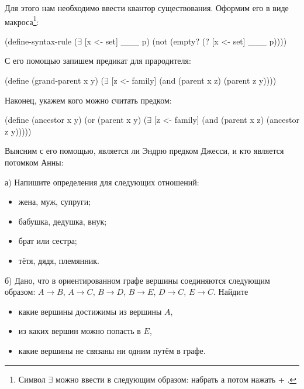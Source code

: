 Для этого нам необходимо ввести квантор существования. Оформим его в виде макроса\footnote{Символ $\exists$ можно ввести в  следующим образом: набрать \s{\\exists} а потом нажать  + \s{\\}.}:

\begin{Definition}[emph={x,set,p}]
(define-syntax-rule ($\exists$ [x <- set] ___ p)
  (not (empty? (? [x <- set] ___ p)))) 
\end{Definition}

С его помощью запишем предикат для прародителя:
\begin{Definition}[emph={x,y,z}]
(define (grand-parent x y)
  ($\exists$ [z <- family] (and (parent x z) (parent z y))))
\end{Definition}

Наконец, укажем кого можно считать предком:
\begin{Definition}[emph={x,y,z}]
(define (ancestor x y) 
  (or (parent x y)
      ($\exists$ [z <- family] (and (parent x z) (ancestor z y)))))  
\end{Definition}

Выясним с его помощью, является ли Эндрю предком Джесси, и кто является потомком Анны:

\newpage
\begin{Assignment}
а)  Напишите определения для следующих отношений:
\begin{itemize}
  \item жена, муж, супруги;
  \item бабушка, дедушка,  внук;
  \item брат или сестра;
  \item тётя, дядя, племянник.
\end{itemize}

\medskip
б)  Дано, что в ориентированном графе вершины соединяются следующим образом: $A\to B$, $A\to C$, $B\to D$, $B\to E$, $D\to C$, $E\to C$. Найдите
\begin{itemize}
\item какие вершины достижимы из вершины $A$,
\item из каких вершин можно попасть в $E$,
\item какие вершины не связаны ни одним путём в графе.
\end{itemize}
\end{Assignment}


